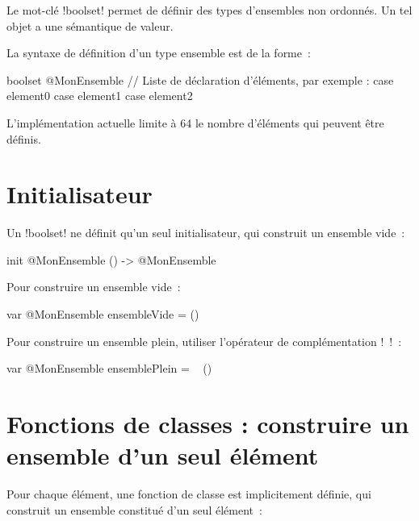 




Le mot-clé \ggsq!boolset! permet de définir des types d'ensembles non ordonnés. Un tel objet a une sémantique de valeur.

La syntaxe de définition d'un type ensemble est de la forme~:

\begin{galgas34}
boolset @MonEnsemble {
  // Liste de déclaration d'éléments, par exemple :
  case element0
  case element1
  case element2
}
\end{galgas34}

L'implémentation actuelle limite à 64 le nombre d'éléments qui peuvent être définis.

\section{Initialisateur}

Un \ggsq!boolset! ne définit qu'un seul initialisateur, qui construit un ensemble vide~:
\begin{galgas34}
init @MonEnsemble () -> @MonEnsemble
\end{galgas34}
Pour construire un ensemble vide~:
\begin{galgas34}
var @MonEnsemble ensembleVide = ()
\end{galgas34}

Pour construire un ensemble plein, utiliser l'opérateur de complémentation \ggsq!~!~:
\begin{galgas34}
var @MonEnsemble ensemblePlein = ~ ()
\end{galgas34}










\section{Fonctions de classes : construire un ensemble d'un seul élément}

Pour chaque élément, une fonction de classe est implicitement définie, qui construit un ensemble constitué d'un seul élément~:

